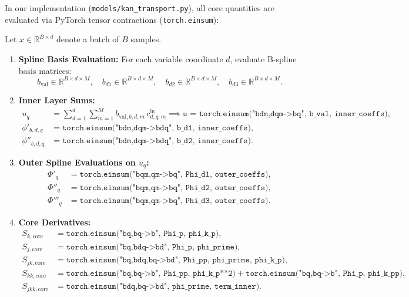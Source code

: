 \documentclass[11pt,a4paper]{article}
\theoremstyle{plain}
\theoremstyle{definition}
\theoremstyle{remark}
\begin{document}
In our implementation (\texttt{models/kan\_transport.py}), all core quantities are evaluated via PyTorch tensor contractions (\texttt{torch.einsum}):

Let $x \in \mathbb{R}^{B \times d}$ denote a batch of $B$ samples.
\begin{enumerate}
    \item \textbf{Spline Basis Evaluation:} For each variable coordinate $d$, evaluate B-spline basis matrices:
    \[
        b_{\text{val}} \in \mathbb{R}^{B \times d \times M}, \quad b_{d1} \in \mathbb{R}^{B \times d \times M}, \quad b_{d2} \in \mathbb{R}^{B \times d \times M}, \quad b_{d3} \in \mathbb{R}^{B \times d \times M}.
    \]
    \item \textbf{Inner Layer Sums:}
    \begin{align*}
        u_q &= \sum_{d=1}^d \sum_{m=1}^M b_{\text{val}, b, d, m} \, c^{\text{in}}_{d, q, m} \implies \texttt{u = torch.einsum("bdm,dqm->bq", b\_val, inner\_coeffs)}, \\
        \phi'_{b, d, q} &= \texttt{torch.einsum("bdm,dqm->bdq", b\_d1, inner\_coeffs)}, \\
        \phi''_{b, d, q} &= \texttt{torch.einsum("bdm,dqm->bdq", b\_d2, inner\_coeffs)}.
    \end{align*}
    \item \textbf{Outer Spline Evaluations on $u_q$:}
    \begin{align*}
        \Phi'_q &= \texttt{torch.einsum("bqm,qm->bq", Phi\_d1, outer\_coeffs)}, \\
        \Phi''_q &= \texttt{torch.einsum("bqm,qm->bq", Phi\_d2, outer\_coeffs)}, \\
        \Phi'''_q &= \texttt{torch.einsum("bqm,qm->bq", Phi\_d3, outer\_coeffs)}.
    \end{align*}
    \item \textbf{Core Derivatives:}
    \begin{align*}
        S_{k, \text{core}} &= \texttt{torch.einsum("bq,bq->b", Phi\_p, phi\_k\_p)}, \\
        S_{j, \text{core}} &= \texttt{torch.einsum("bq,bdq->bd", Phi\_p, phi\_prime)}, \\
        S_{jk, \text{core}} &= \texttt{torch.einsum("bq,bdq,bq->bd", Phi\_pp, phi\_prime, phi\_k\_p)}, \\
        S_{kk, \text{core}} &= \texttt{torch.einsum("bq,bq->b", Phi\_pp, phi\_k\_p**2)} + \texttt{torch.einsum("bq,bq->b", Phi\_p, phi\_k\_pp)}, \\
        S_{jkk, \text{core}} &= \texttt{torch.einsum("bdq,bq->bd", phi\_prime, term\_inner)}.
    \end{align*}
\end{enumerate}
\end{document}
